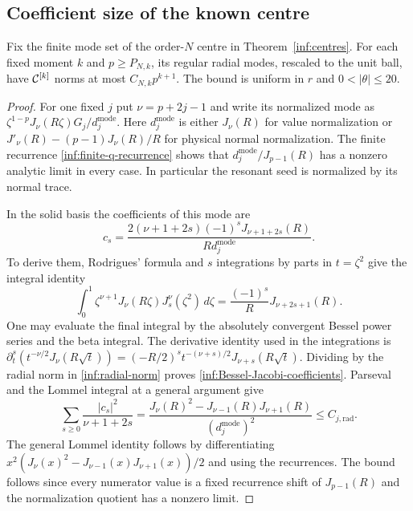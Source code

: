 \subsection{Coefficient size of the known centre}

\begin{lemma}
\label{inf:radial-centre-norm}
Fix the finite mode set of the order-$N$ centre in
Theorem~\ref{inf:centres}. For each fixed moment $k$ and
$p\ge P_{N,k}$, its regular radial modes,
rescaled to the unit ball, have $\mathcal C^{[k]}$ norms at most
$C_{N,k}p^{k+1}$. The bound is uniform in $r$ and
$0<|\theta|\le20$.
\end{lemma}
\begin{proof}
For one fixed $j$ put $\nu=p+2j-1$ and write its normalized mode as
$\zeta^{1-p}J_\nu(R\zeta)G_j/d_j^{\mathrm{mode}}$.
Here $d_j^{\mathrm{mode}}$ is either $J_\nu(R)$ for value normalization or
$J'_\nu(R)-(p-1)J_\nu(R)/R$ for physical normal normalization.
The finite recurrence \eqref{inf:finite-q-recurrence} shows that
$d_j^{\mathrm{mode}}/J_{p-1}(R)$ has a nonzero analytic limit in every case.
In particular the resonant seed is normalized by its normal trace.

In the solid basis the coefficients of this mode are
\begin{equation}\label{inf:Bessel-Jacobi-coefficients}
 c_s=\frac{2(\nu+1+2s)(-1)^sJ_{\nu+1+2s}(R)}{Rd_j^{\mathrm{mode}}}.
\end{equation}
To derive them, Rodrigues' formula and $s$ integrations by parts
in $t=\zeta^2$ give the integral identity
\[
 \int_0^1\zeta^{\nu+1}J_\nu(R\zeta)J_s^\nu(\zeta^2)\,d\zeta
 =\frac{(-1)^s}{R}J_{\nu+2s+1}(R).
\]
One may evaluate the final integral by the absolutely convergent
Bessel power series and the beta integral. The derivative identity
used in the integrations is
$\partial_t^s(t^{-\nu/2}J_\nu(R\sqrt t))
=(-R/2)^st^{-(\nu+s)/2}J_{\nu+s}(R\sqrt t)$.
Dividing by the radial norm in \eqref{inf:radial-norm} proves
\eqref{inf:Bessel-Jacobi-coefficients}.
Parseval and the Lommel integral at a general argument give
\begin{equation}\label{inf:centre-parseval}
 \sum_{s\ge0}\frac{|c_s|^2}{\nu+1+2s}
 =\frac{J_\nu(R)^2-J_{\nu-1}(R)J_{\nu+1}(R)}{(d_j^{\mathrm{mode}})^2}
 \le C_{j,\mathrm{rad}}.
\end{equation}
The general Lommel identity follows by differentiating
$x^2(J_\nu(x)^2-J_{\nu-1}(x)J_{\nu+1}(x))/2$ and using the
recurrences. The bound follows since every numerator value is a
fixed recurrence shift of $J_{p-1}(R)$ and the normalization
quotient has a nonzero limit.


\end{proof}
